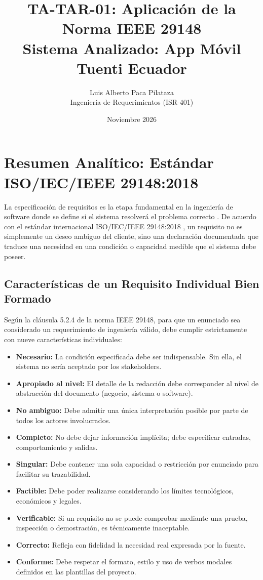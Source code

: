 \documentclass[12pt,a4paper]{article}
\title{TA-TAR-01: Aplicación de la Norma IEEE 29148 \\ Sistema Analizado: App Móvil Tuenti Ecuador}
\author{Luis Alberto Paca Pilataza \\ Ingeniería de Requerimientos (ISR-401)}
\date{Noviembre 2026}
\begin{document}
\maketitle

\section{Resumen Analítico: Estándar ISO/IEC/IEEE 29148:2018}

La especificación de requisitos es la etapa fundamental en la ingeniería de software donde se define si el sistema resolverá el problema correcto \cite{swebok2024}. De acuerdo con el estándar internacional ISO/IEC/IEEE 29148:2018 \cite{iso29148}, un requisito no es simplemente un deseo ambiguo del cliente, sino una declaración documentada que traduce una necesidad en una condición o capacidad medible que el sistema debe poseer.

\subsection{Características de un Requisito Individual Bien Formado}
Según la cláusula 5.2.4 de la norma IEEE 29148, para que un enunciado sea considerado un requerimiento de ingeniería válido, debe cumplir estrictamente con nueve características individuales:

\begin{itemize}
    \item \textbf{Necesario:} La condición especificada debe ser indispensable. Sin ella, el sistema no sería aceptado por los stakeholders.
    \item \textbf{Apropiado al nivel:} El detalle de la redacción debe corresponder al nivel de abstracción del documento (negocio, sistema o software).
    \item \textbf{No ambiguo:} Debe admitir una única interpretación posible por parte de todos los actores involucrados.
    \item \textbf{Completo:} No debe dejar información implícita; debe especificar entradas, comportamiento y salidas.
    \item \textbf{Singular:} Debe contener una sola capacidad o restricción por enunciado para facilitar su trazabilidad.
    \item \textbf{Factible:} Debe poder realizarse considerando los límites tecnológicos, económicos y legales.
    \item \textbf{Verificable:} Si un requisito no se puede comprobar mediante una prueba, inspección o demostración, es técnicamente inaceptable.
    \item \textbf{Correcto:} Refleja con fidelidad la necesidad real expresada por la fuente.
    \item \textbf{Conforme:} Debe respetar el formato, estilo y uso de verbos modales definidos en las plantillas del proyecto.
\end{itemize}
\end{document}
